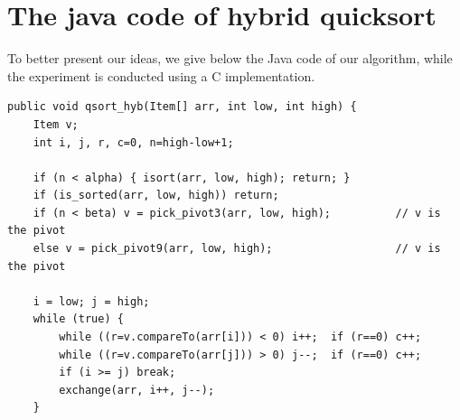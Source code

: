 \documentclass[AMA,STIX1COL]{WileyNJD-v2}
\begin{document}
\section{The java code of hybrid quicksort}\label{javacode}                
To better present our ideas, we give below the Java code of our algorithm, while the experiment is conducted using a C implementation.
\begin{lstlisting}
public void qsort_hyb(Item[] arr, int low, int high) {                                                                                                                                                                                                                                                 
    Item v;                                                                                                                                                  
    int i, j, r, c=0, n=high-low+1;                                                                                                                                              
                                                                                                                                                                   
    if (n < alpha) { isort(arr, low, high); return; }                                                                                                                     
    if (is_sorted(arr, low, high)) return;                                                                                                                              
    if (n < beta) v = pick_pivot3(arr, low, high);          // v is the pivot                                                                                 
    else v = pick_pivot9(arr, low, high);                   // v is the pivot                                                                                 
          
    i = low; j = high;
    while (true) {                                                                                                                                               
        while ((r=v.compareTo(arr[i])) < 0) i++;  if (r==0) c++;                                                                                                                                         
        while ((r=v.compareTo(arr[j])) > 0) j--;  if (r==0) c++;                                                                                                                                         
        if (i >= j) break;                                                                                                                                   
        exchange(arr, i++, j--);                                                                                                                                                                                                                                                               
    }                                                                                                                                                        
                                                                                                                                                                   

\end{lstlisting}
\end{document}
